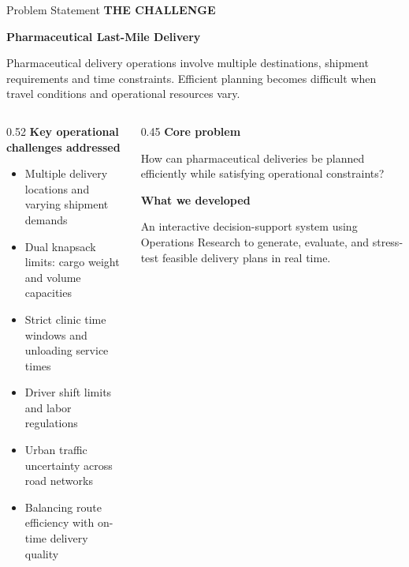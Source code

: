\documentclass[aspectratio=169,10pt]{beamer}
\newcommand{\sectiontag}[1]{%
    {\scriptsize\bfseries\color{Accent}\MakeUppercase{#1}}\par\vspace{0.08cm}
}
\begin{document}
\begin{frame}{Problem Statement}
\sectiontag{The Challenge}

\textbf{\color{Primary}\normalsize Pharmaceutical Last-Mile Delivery}

\vspace{0.05cm}
\footnotesize
Pharmaceutical delivery operations involve multiple destinations, shipment
requirements and time constraints. Efficient planning becomes difficult when
travel conditions and operational resources vary.

\vspace{0.15cm}

\begin{columns}[T,totalwidth=\textwidth]
    \begin{column}{0.52\textwidth}
        \textbf{\color{Primary}\small Key operational challenges addressed}

        \begin{itemize}
            \setlength{\itemsep}{0pt}
            \item Multiple delivery locations and varying shipment demands
            \item Dual knapsack limits: cargo weight and volume capacities
            \item Strict clinic time windows and unloading service times
            \item Driver shift limits and labor regulations
            \item Urban traffic uncertainty across road networks
            \item Balancing route efficiency with on-time delivery quality
        \end{itemize}
    \end{column}

    \begin{column}{0.45\textwidth}
        \textbf{\color{Primary}\small Core problem}

        \vspace{0.04cm}
        \footnotesize
        How can pharmaceutical deliveries be planned efficiently while
        satisfying operational constraints?

        \vspace{0.2cm}
        \textbf{\color{Primary}\small What we developed}

        \vspace{0.04cm}
        \footnotesize
        An interactive decision-support system using Operations
        Research to generate, evaluate, and stress-test feasible delivery plans in real time.
    \end{column}
\end{columns}
\end{frame}
\end{document}

